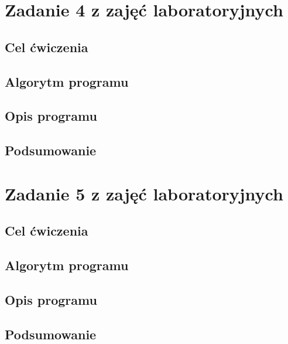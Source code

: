 \documentclass[a4paper]{article} %
\newcommand{\forceindent}{\leavevmode{\parindent=1cm\indent}} %
\begin{document}
\tableofcontents
\newpage


\section{Zadanie 4 z zajęć laboratoryjnych}
\subsection{Cel ćwiczenia}
\forceindent \lipsum[1-8][2-8]
\subsection{Algorytm programu}
\forceindent\lipsum[1-8][2-8]
\subsection{Opis programu}
\forceindent\lipsum[3-8][2-8]
\subsection{Podsumowanie}
\forceindent\lipsum[1-8][2-8]
\section{Zadanie 5 z zajęć laboratoryjnych}
\subsection{Cel ćwiczenia}
\forceindent\lipsum[1-8][2-8]

\subsection{Algorytm programu}
\forceindent\lipsum[1-8][2-8]
\subsection{Opis programu}
\forceindent\lipsum[1-8][1-18]
\subsection{Podsumowanie}
\forceindent\lipsum[1-8][2-8]
\end{document}
